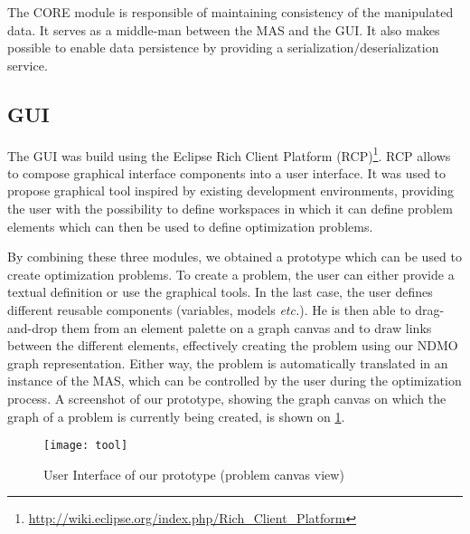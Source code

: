 The CORE module is responsible of maintaining consistency of the manipulated data. It serves as a middle-man between the MAS and the GUI. It also makes possible to enable data persistence by providing a serialization/deserialization service.

\subsection{GUI}

The GUI was build using the Eclipse Rich Client Platform (RCP)\footnote{\url{http://wiki.eclipse.org/index.php/Rich_Client_Platform}}. RCP allows to compose graphical interface components into a user interface. It was used to propose graphical tool inspired by existing development environments, providing the user with the possibility to define workspaces in which it can define problem elements which can then be used to define optimization problems.

\bigskip

By combining these three modules, we obtained a prototype which can be used to create optimization problems. To create a problem, the user can either provide a textual definition or use the graphical tools. In the last case, the user defines different reusable components (variables, models \emph{etc.}). He is then able to drag-and-drop them from an element palette on a graph canvas and to draw links between the different elements, effectively creating the problem using our NDMO graph representation. Either way, the problem is automatically translated in an instance of the MAS, which can be controlled by the user during the optimization process. A screenshot of our prototype, showing the graph canvas on which the graph of a problem is currently being created, is shown on \figurename{} \ref{tool}.

\begin{figure}
\texttt{[image: tool]}
\caption{User Interface of our prototype (problem canvas view)}\label{tool}
\end{figure}